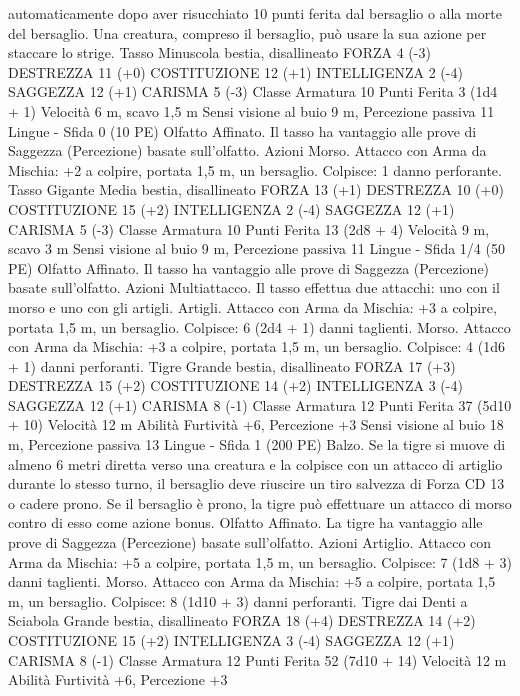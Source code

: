 \begin{multicols}{2}
automaticamente dopo aver risucchiato 10 punti ferita dal
bersaglio o alla morte del bersaglio. Una creatura, compreso il
bersaglio, può usare la sua azione per staccare lo strige.
Tasso
Minuscola bestia, disallineato
FORZA 4 (-3)
DESTREZZA 11 (+0)
COSTITUZIONE 12 (+1)
INTELLIGENZA 2 (-4)
SAGGEZZA 12 (+1)
CARISMA 5 (-3)
Classe Armatura 10
Punti Ferita 3 (1d4 + 1)
Velocità 6 m, scavo 1,5 m
Sensi visione al buio 9 m, Percezione passiva 11
Lingue -
Sfida 0 (10 PE)
Olfatto Affinato. Il tasso ha vantaggio alle prove di Saggezza
(Percezione) basate sull’olfatto.
Azioni
Morso. Attacco con Arma da Mischia: +2 a colpire, portata 1,5
m, un bersaglio.
Colpisce: 1 danno perforante.
Tasso Gigante
Media bestia, disallineato
FORZA 13 (+1)
DESTREZZA 10 (+0)
COSTITUZIONE 15 (+2)
INTELLIGENZA 2 (-4)
SAGGEZZA 12 (+1)
CARISMA 5 (-3)
Classe Armatura 10
Punti Ferita 13 (2d8 + 4)
Velocità 9 m, scavo 3 m
Sensi visione al buio 9 m, Percezione passiva 11
Lingue -
Sfida 1/4 (50 PE)
Olfatto Affinato. Il tasso ha vantaggio alle prove di Saggezza
(Percezione) basate sull’olfatto.
Azioni
Multiattacco. Il tasso effettua due attacchi: uno con il morso e
uno con gli artigli.
Artigli. Attacco con Arma da Mischia: +3 a colpire, portata 1,5
m, un bersaglio.
Colpisce: 6 (2d4 + 1) danni taglienti.
Morso. Attacco con Arma da Mischia: +3 a colpire, portata 1,5
m, un bersaglio.
Colpisce: 4 (1d6 + 1) danni perforanti.
Tigre
Grande bestia, disallineato
FORZA 17 (+3)
DESTREZZA 15 (+2)
COSTITUZIONE 14 (+2)
INTELLIGENZA 3 (-4)
SAGGEZZA 12 (+1)
CARISMA 8 (-1)
Classe Armatura 12
Punti Ferita 37 (5d10 + 10)
Velocità 12 m
Abilità Furtività +6, Percezione +3
Sensi visione al buio 18 m, Percezione passiva 13
Lingue -
Sfida 1 (200 PE)
Balzo. Se la tigre si muove di almeno 6 metri diretta verso una
creatura e la colpisce con un attacco di artiglio durante lo stesso
turno, il bersaglio deve riuscire un tiro salvezza di Forza CD 13 o
cadere prono. Se il bersaglio è prono, la tigre può effettuare un
attacco di morso contro di esso come azione bonus.
Olfatto Affinato. La tigre ha vantaggio alle prove di Saggezza
(Percezione) basate sull’olfatto.
Azioni
Artiglio. Attacco con Arma da Mischia: +5 a colpire, portata 1,5
m, un bersaglio.
Colpisce: 7 (1d8 + 3) danni taglienti.
Morso. Attacco con Arma da Mischia: +5 a colpire, portata 1,5
m, un bersaglio.
Colpisce: 8 (1d10 + 3) danni perforanti.
Tigre dai Denti a
Sciabola
Grande bestia, disallineato
FORZA 18 (+4)
DESTREZZA 14 (+2)
COSTITUZIONE 15 (+2)
INTELLIGENZA 3 (-4)
SAGGEZZA 12 (+1)
CARISMA 8 (-1)
Classe Armatura 12
Punti Ferita 52 (7d10 + 14)
Velocità 12 m
Abilità Furtività +6, Percezione +3

\end{multicols}
